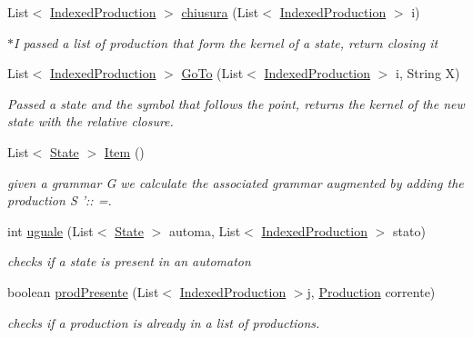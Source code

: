 \begin{DoxyCompactItemize}
\item 
List$<$ \hyperlink{classcontext_free_1_1scanner_1_1_indexed_production}{Indexed\-Production} $>$ \hyperlink{classcontext_free_1_1scanner_1_1_l_r0_a313dfc00f370a910932b02034e26fb8c}{chiusura} (List$<$ \hyperlink{classcontext_free_1_1scanner_1_1_indexed_production}{Indexed\-Production} $>$ i)
\begin{DoxyCompactList}\small\item\em $\ast$\-I passed a list of production that form the kernel of a state, return closing it \end{DoxyCompactList}\item 
List$<$ \hyperlink{classcontext_free_1_1scanner_1_1_indexed_production}{Indexed\-Production} $>$ \hyperlink{classcontext_free_1_1scanner_1_1_l_r0_a087486ba03c2fb5ab400e425e7b54bbc}{Go\-To} (List$<$ \hyperlink{classcontext_free_1_1scanner_1_1_indexed_production}{Indexed\-Production} $>$ i, String X)
\begin{DoxyCompactList}\small\item\em Passed a state and the symbol that follows the point, returns the kernel of the new state with the relative closure. \end{DoxyCompactList}\item 
List$<$ \hyperlink{classcontext_free_1_1scanner_1_1_state}{State} $>$ \hyperlink{classcontext_free_1_1scanner_1_1_l_r0_a5c7d77fe2a994398ef6312251e2f6109}{Item} ()
\begin{DoxyCompactList}\small\item\em given a grammar G we calculate the associated grammar augmented by adding the production S '\-:\-: =. \end{DoxyCompactList}\item 
int \hyperlink{classcontext_free_1_1scanner_1_1_l_r0_ace66d28273502a9daf8e4550f48b5782}{uguale} (List$<$ \hyperlink{classcontext_free_1_1scanner_1_1_state}{State} $>$ automa, List$<$ \hyperlink{classcontext_free_1_1scanner_1_1_indexed_production}{Indexed\-Production} $>$ stato)
\begin{DoxyCompactList}\small\item\em checks if a state is present in an automaton \end{DoxyCompactList}\item 
boolean \hyperlink{classcontext_free_1_1scanner_1_1_l_r0_a43275125600a950a4a1f78ce565eac5f}{prod\-Presente} (List$<$ \hyperlink{classcontext_free_1_1scanner_1_1_indexed_production}{Indexed\-Production} $>$j, \hyperlink{classcontext_free_1_1grammar_1_1_production}{Production} corrente)
\begin{DoxyCompactList}\small\item\em checks if a production is already in a list of productions. \end{DoxyCompactList}\end{DoxyCompactItemize}
